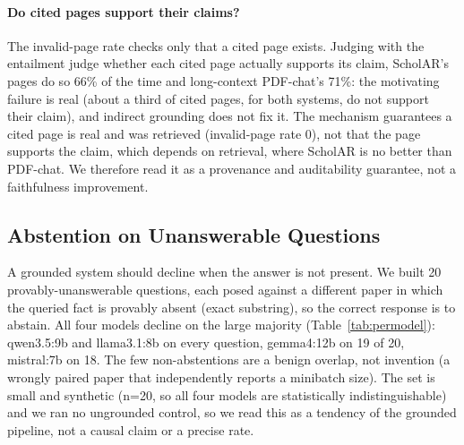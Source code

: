 \documentclass[letterpaper]{article} %
\begin{document}
\paragraph{Do cited pages support their claims?} The invalid-page rate checks only that a cited
page exists. Judging with the entailment judge whether each cited page actually supports its claim,
ScholAR's pages do so 66\% of the time and long-context PDF-chat's 71\%: the motivating failure is
real (about a third of cited pages, for both systems, do not support their claim), and indirect
grounding does not fix it. The mechanism guarantees a cited page is real and was retrieved
(invalid-page rate 0), not that the page supports the claim, which depends on retrieval, where
ScholAR is no better than PDF-chat. We therefore read it as a provenance and auditability
guarantee, not a faithfulness improvement.

\subsection{Abstention on Unanswerable Questions}
\label{sec:abstention}
A grounded system should decline when the answer is not present. We built 20 provably-unanswerable
questions, each posed against a different paper in which the queried fact is provably absent (exact
substring), so the correct response is to abstain. All four models decline on the large majority
(Table~\ref{tab:permodel}): qwen3.5:9b and llama3.1:8b on every question, gemma4:12b on 19 of 20,
mistral:7b on 18. The few non-abstentions are a benign overlap, not invention (a wrongly paired
paper that independently reports a minibatch size). The set is small and synthetic (n=20, so all
four models are statistically indistinguishable) and we ran no ungrounded control, so we read this
as a tendency of the grounded pipeline, not a causal claim or a precise rate.
\end{document}
